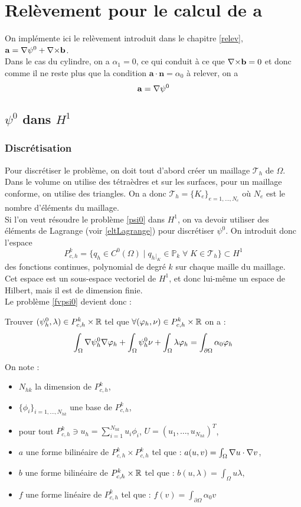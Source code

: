 \chapter{Relèvement pour le calcul de $\mathbf{a}$}
On implémente ici le relèvement introduit dans le chapitre \ref{relev}, $\mathbf{a}={\nabla}\psi^0+{\nabla\times}\mathbf{b}$.\\
Dans le cas du cylindre, on a $\alpha_1=0$, ce qui conduit à ce que ${\nabla\times} \mathbf{b}=0$ et donc comme il ne reste plus que la condition $\mathbf{a}\cdot\mathbf{n}=\alpha_0$ à relever, on a \[ \mathbf{a}={\nabla}\psi^0 \]

\section{$\psi^0$ dans $H^1$}
\subsection{Discrétisation}\label{discGradh1}
Pour discrétiser le problème, on doit tout d'abord créer un maillage $\mathcal{T}_h$ de $\Omega$. Dans le volume on utilise des tétraèdres et sur les surfaces, pour un maillage conforme, on utilise des triangles. On a donc $\mathcal{T}_h=\{K_e\}_{e=1,\dots,N_e}$ où $N_e$ est le nombre d'éléments du maillage.\\
Si l'on veut résoudre le problème \ref{psi0} dans $H^1$, on va devoir utiliser des éléments de Lagrange (voir \ref{eltLagrange}) pour discrétiser $\psi^0$. On introduit donc l'espace
\[   P^k_{c,h} = \{ q_h \in C^0(\Omega) \; |\; q_h{}_{|_K} \in \mathbb{P}_k\; \forall\; K \in \mathcal{T}_h\} \subset H^1 \]
des fonctions continues, polynomial de degré $k$ sur chaque maille du maillage.\\
Cet espace est un sous-espace vectoriel de $H^1$, et donc lui-même un espace de Hilbert, mais il est de dimension finie.\\

Le problème \ref{fvpsi0} devient donc :
\begin{pb}\label{dcpsi0}
Trouver $(\psi^0_h, \lambda)\in P^k_{c,h}\times {\mathbb{R}}$ tel que $\forall (\varphi_h,\nu)\in P^k_{c,h}\times {\mathbb{R}}$ on a :
\[ \int_\Omega{\nabla} \psi^0_h{\nabla}\varphi_h + \int_\Omega \psi^0_h\nu + \int_\Omega \lambda\varphi_h = \int_{\partial\Omega} \alpha_0\varphi_h \]
\end{pb}

On note :
\begin{itemize}
\item $N_{hk}$ la dimension de $P^k_{c,h}$,
\item $\{\phi_i\}_{i=1,\dots,N_{hk}}$ une base de $P^k_{c,h}$,
\item pour tout $P^k_{c,h}\ni u_h=\sum_{i=1}^{N_{hk}} u_i\phi_i$, $U=(u_1,\dots,u_{N_{hk}})^T$,
\item $a$ une forme bilinéaire de $P^k_{c,h}\times P^k_{c,h}$ tel que : $a(u,v)=\int_\Omega {\nabla} u\cdot {\nabla} v$,
\item $b$ une forme bilinéaire de $P^k_{c,h}\times{\mathbb{R}}$ tel que : $b(u,\lambda) = \int_\Omega u\lambda$,
\item $f$ une forme linéaire de $P^k_{c,h}$ tel que : $f(v)=\int_{\partial\Omega} \alpha_0 v$
\end{itemize}

